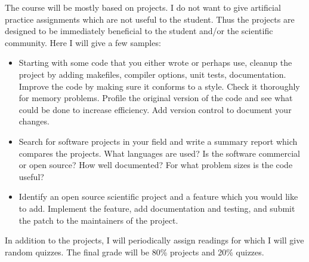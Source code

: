 \documentclass[12 pt]{article}
\begin{document}
The course will be mostly based on projects. I do not want to give
artificial practice assignments which are not useful to the
student. Thus the projects are designed to be immediately beneficial
to the student and/or the scientific community. Here I will give a few
samples:
\begin{itemize}
\item Starting with some code that you either wrote or perhaps use,
  cleanup the project by adding makefiles, compiler options, unit
  tests, documentation. Improve the code by making sure it conforms to
  a style. Check it thoroughly for memory problems. Profile the
  original version of the code and see what could be done to increase
  efficiency. Add version control to document your changes.
\item Search for software projects in your field and write a summary
  report which compares the projects. What languages are used? Is the
  software commercial or open source? How well documented? For what
  problem sizes is the code useful?
\item Identify an open source scientific project and a feature which
  you would like to add. Implement the feature, add documentation and
  testing, and submit the patch to the maintainers of the project.
\end{itemize}
In addition to the projects, I will periodically assign readings for
which I will give random quizzes. The final grade will be 80\%
projects and 20\% quizzes.

\clearpage
 
\end{document}
